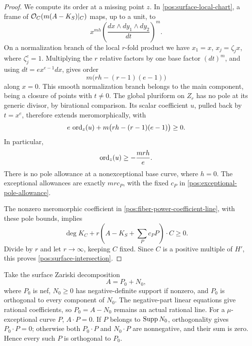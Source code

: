 \begin{proof}
We compute its order at a missing point \(z\). In
\eqref{pos:surface-local-chart}, a frame of
\(\mathcal{O}_C(m(A-K_S)|_C)\) maps, up to a unit, to
\[
 x^{mh}\left(\frac{dx\wedge dy_1\wedge dy_2}{dt}\right)^{\!m}.
\]
On a normalization branch of the local \(r\)-fold product we have
\(x_1=x\), \(x_j=\zeta_jx\), where \(\zeta_j^e=1\). Multiplying
the \(r\) relative factors by one base factor \((dt)^m\), and using
\(dt=ex^{e-1}dx\), gives order
\begin{equation}\label{pos:fiber-power-order}
 m\bigl(rh-(r-1)(e-1)\bigr)
\end{equation}
along \(x=0\). This smooth normalization branch belongs to the main
component, being a closure of points with \(t\ne0\). The global
pluriform on \(Z_r\) has no pole at its generic divisor, by birational
comparison. Its scalar coefficient \(u\), pulled back by \(t=x^e\),
therefore extends meromorphically, with
\[
 e\,\operatorname{ord}_z(u)+m\bigl(rh-(r-1)(e-1)\bigr)\geq0.
\]
In particular,
\begin{equation}\label{pos:fiber-power-pole-bound}
 \operatorname{ord}_z(u)\geq-\frac{mrh}{e}.
\end{equation}
There is no pole allowance at a nonexceptional base curve, where
\(h=0\). The exceptional allowances are exactly
\(mr c_P\), with the fixed \(c_P\) in
\eqref{pos:exceptional-pole-allowance}.

The nonzero meromorphic coefficient in
\eqref{pos:fiber-power-coefficient-line}, with these pole bounds,
implies
\[
 \deg K_C+r\left(A-K_S+\sum_Pc_PP\right)\cdot C\geq0.
\]
Divide by \(r\) and let \(r\to\infty\), keeping \(C\) fixed.
Since \(C\) is a positive multiple of \(H'\), this proves
\eqref{pos:surface-intersection}.
\end{proof}

Take the surface Zariski decomposition \cite{BHPV}
\begin{equation}\label{pos:zariski-decomposition}
 A=P_0+N_0,
\end{equation}
where \(P_0\) is nef, \(N_0\geq0\) has negative-definite support
if nonzero, and \(P_0\) is orthogonal to every component of \(N_0\).
The negative-part linear equations give rational coefficients, so
\(P_0=A-N_0\) remains an actual rational line. For a
\(\mu\)-exceptional curve \(P\), \(A\cdot P=0\). If \(P\) belongs
to \(\operatorname{Supp} N_0\), orthogonality gives \(P_0\cdot P=0\); otherwise
both \(P_0\cdot P\) and \(N_0\cdot P\) are nonnegative, and their
sum is zero. Hence every such \(P\) is orthogonal to \(P_0\).

